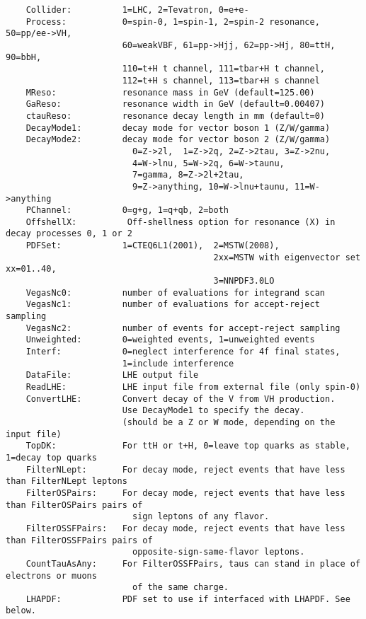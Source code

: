 \documentclass[aps,superscriptaddress,nofootinbib]{revtex4}
\begin{document}
\begin{verbatim}
    Collider:          1=LHC, 2=Tevatron, 0=e+e-
    Process:           0=spin-0, 1=spin-1, 2=spin-2 resonance, 50=pp/ee->VH,
                       60=weakVBF, 61=pp->Hjj, 62=pp->Hj, 80=ttH, 90=bbH,
                       110=t+H t channel, 111=tbar+H t channel,
                       112=t+H s channel, 113=tbar+H s channel
    MReso:             resonance mass in GeV (default=125.00)
    GaReso:            resonance width in GeV (default=0.00407)
    ctauReso:          resonance decay length in mm (default=0)
    DecayMode1:        decay mode for vector boson 1 (Z/W/gamma)
    DecayMode2:        decay mode for vector boson 2 (Z/W/gamma)
                         0=Z->2l,  1=Z->2q, 2=Z->2tau, 3=Z->2nu,
                         4=W->lnu, 5=W->2q, 6=W->taunu,
                         7=gamma, 8=Z->2l+2tau,
                         9=Z->anything, 10=W->lnu+taunu, 11=W->anything
    PChannel:          0=g+g, 1=q+qb, 2=both
    OffshellX:          Off-shellness option for resonance (X) in decay processes 0, 1 or 2
    PDFSet:            1=CTEQ6L1(2001),  2=MSTW(2008),
                                         2xx=MSTW with eigenvector set xx=01..40,
                                         3=NNPDF3.0LO
    VegasNc0:          number of evaluations for integrand scan
    VegasNc1:          number of evaluations for accept-reject sampling
    VegasNc2:          number of events for accept-reject sampling
    Unweighted:        0=weighted events, 1=unweighted events
    Interf:            0=neglect interference for 4f final states,
                       1=include interference
    DataFile:          LHE output file
    ReadLHE:           LHE input file from external file (only spin-0)
    ConvertLHE:        Convert decay of the V from VH production.
                       Use DecayMode1 to specify the decay.
                       (should be a Z or W mode, depending on the input file)
    TopDK:             For ttH or t+H, 0=leave top quarks as stable, 1=decay top quarks
    FilterNLept:       For decay mode, reject events that have less than FilterNLept leptons
    FilterOSPairs:     For decay mode, reject events that have less than FilterOSPairs pairs of
                         sign leptons of any flavor.
    FilterOSSFPairs:   For decay mode, reject events that have less than FilterOSSFPairs pairs of
                         opposite-sign-same-flavor leptons.
    CountTauAsAny:     For FilterOSSFPairs, taus can stand in place of electrons or muons
                         of the same charge.
    LHAPDF:            PDF set to use if interfaced with LHAPDF. See below.

\end{verbatim}
\end{document}
